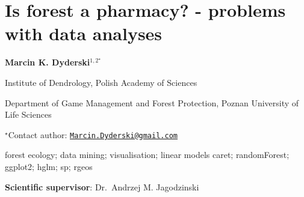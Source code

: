 \documentclass[\main/boa.tex]{subfiles}
\begin{document}
\section{Is forest a pharmacy? - problems with data analyses}

\begin{center}
  {\bf {} Marcin K. Dyderski$^{1, 2^\star}$}
\end{center}

\vskip 0.3cm

\begin{affiliations}
\begin{enumerate}
\begin{minipage}{0.915\textwidth}
\centering
\item Institute of Dendrology, Polish Academy of Sciences \\[-2pt]
\item Department of Game Management and Forest Protection, Poznan University
of Life Sciences \\[-2pt]
\end{minipage}
\end{enumerate}
$^\star$Contact author: \href{mailto:Marcin.Dyderski@gmail.com}{\nolinkurl{Marcin.Dyderski@gmail.com}}\\
\end{affiliations}

\vskip 0.5cm

\begin{minipage}{0.915\textwidth}
\keywords forest ecology; data mining; visualisation; linear models
\packages {} caret;  randomForest;  ggplot2;  hglm;  sp;  rgeos
\end{minipage}

\vskip 0.8cm

\textbf{Scientific supervisor}: Dr.~Andrzej M. Jagodzinski
\end{document}
